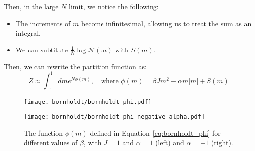 Then, in the large $N$ limit, we notice the following:
\begin{itemize}
    \item The increments of $m$ become infinitesimal, allowing us to treat the sum as an integral.
    \item We can subtitute $\frac{1}{N}\log\mathcal{N}(m)$ with $S(m)$.
\end{itemize}
Then, we can rewrite the partition function as:
\begin{equation}
    Z \approx \int_{-1}^{1} dm e^{N\phi(m)}, \quad \text{where }
    \phi(m) = \beta J m^2 - \alpha m |m| + S(m)
    \label{eq:bornholdt_phi}
\end{equation}
\begin{figure}[h]
    \centering
    \begin{minipage}[t]{0.45\textwidth}
        \centering
        \texttt{[image: bornholdt/bornholdt\_phi.pdf]}
    \end{minipage}
    \hfill
    \begin{minipage}[t]{0.45\textwidth}
        \centering
        \texttt{[image: bornholdt/bornholdt\_phi\_negative\_alpha.pdf]}
    \end{minipage}
    \caption{The function $\phi(m)$ defined in Equation~\ref{eq:bornholdt_phi} for different values of $\beta$, with $J=1$ and $\alpha=1$ (left) and $\alpha=-1$ (right).}
    \label{fig:bornholdt_phi}
\end{figure}

